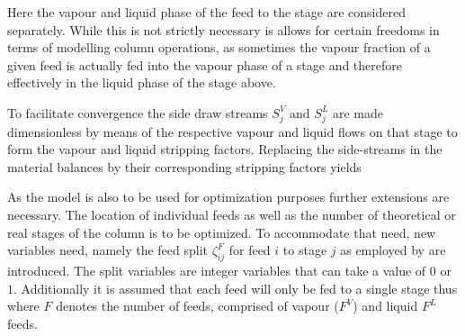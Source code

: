         Here the vapour and liquid phase of the feed to the stage are considered separately.
        While this is not strictly necessary is allows for certain freedoms in terms of modelling
        column operations, as sometimes the vapour fraction of a given feed is actually fed into
        the vapour phase of a stage and therefore effectively in the liquid phase of the stage above.

        To facilitate convergence the side draw streams $S_j^V$ and $S_j^L$ are made dimensionless
        by means of the respective vapour and liquid flows on that stage to form the
        vapour
        and liquid
        stripping factors. Replacing the side-streams in the material balances by their
        corresponding stripping factors yields

        As the model is also to be used for optimization purposes further extensions are necessary.
        The location of individual feeds as well as the number of theoretical or real stages of the
        column is to be optimized. To accommodate that need, new variables need, namely the feed
        split $\zeta_{ij}^F$ for feed $i$ to stage $j$ as employed by \cite{Dunnebier.1999} are introduced.
        The split variables are integer variables that can take a value of $0$ or $1$. Additionally it is
        assumed that each feed will only be fed to a single stage thus
        where $F$ denotes the number of feeds, comprised of vapour ($F^V$) and liquid $F^L$ feeds.


